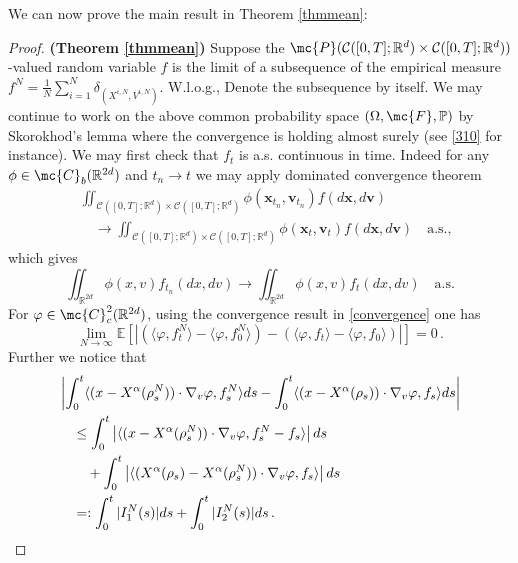 \documentclass{ims9x6}
\newcommand{\nn}{\nonumber}
\newcommand{\R}{{\mathbb R}}
\newcommand{\CR}{\mathcal{C}([0,T];\mathbb{R}^d)}
\newcommand{\EE}{\mathbb{E}}
\newcommand{\RR}{\mathbb{R}}
\newcommand{\PP}{\mathbb{P}}
\newcommand{\la}{\langle}
\newcommand{\ra}{\rangle}
\begin{document}
We can now prove the main result in Theorem \ref{thmmean}:
\begin{proof}{\textbf{(Theorem \ref{thmmean})}}
	Suppose the $\mc{P}(\CR\times\CR)$-valued random variable $f$ is the limit of a subsequence of the empirical measure $f^N=\frac{1}{N}\sum_{i=1}^N\delta_{(X^{i,N},V^{i,N})}$. W.l.o.g., Denote the subsequence by itself. We may continue to work on the above common probability space $(\Omega,\mc{F},\PP)$ by Skorokhod's lemma where the convergence is holding almost surely (see \eqref{310} for instance). We may first check that  $f_t$ is a.s. continuous in time. Indeed for any $\phi\in\mc{C}_b(\R^{2d})$ and $t_n\to t$ we may apply dominated convergence theorem
	\begin{align*}
	&\iint_{\CR\times\CR}\phi(\textbf{x}_{t_n},\textbf{v}_{t_n})f(d\textbf{x},d\textbf{v})\nn\\
	&\quad\to \iint_{\CR\times \CR}\phi(\textbf{x}_{t},\textbf{v}_{t}) f(d\textbf{x},d\textbf{v})\quad \text{a.s.,}
	\end{align*}
	which gives
	\begin{equation*}
	\iint_{\R^{2d} }\phi(x,v)f_{t_n}(d{x},dv)\to \iint_{\R^{2d}}\phi(x,v)f_t(d{x},dv)\quad\text{a.s.}
	\end{equation*}
	For $\varphi\in \mc{C}_c^2(\RR^{2d})$, using the convergence result in \eqref{convergence} one has
	\begin{equation}\label{est1}
	\lim_{N\rightarrow \infty} \EE\left[|(\la \varphi ,f_t^N\ra-\la \varphi,f_0^N \ra) -(\la \varphi ,f_t \ra-\la \varphi,f_0\ra)|\right]=0\,.
	\end{equation}
	Further we notice that
      \begin{align*}
		&\left|\int_0^t\la (x-X^\alpha(\rho_s^N))\cdot \nabla_v\varphi, f_s^N \ra ds -\int_0^t\la (x-X^\alpha(\rho_s))\cdot \nabla_v\varphi, f_s \ra ds\right|\notag\\
		&\quad \leq \int_0^t\left|\la (x-X^\alpha(\rho_s^N))\cdot \nabla_v\varphi, f_s^N -f_s \ra \right| ds \nn\\
		&\qquad +\int_0^t\left|\la (X^\alpha(\rho_s)-X^\alpha(\rho_s^N))\cdot \nabla_v\varphi , f_s \ra\right| ds \notag\\
		&\quad =:\int_0^t|I_1^N(s)|ds+\int_0^t|I_2^N(s)|ds\,.

\end{align*}
\end{proof}
\end{document}
